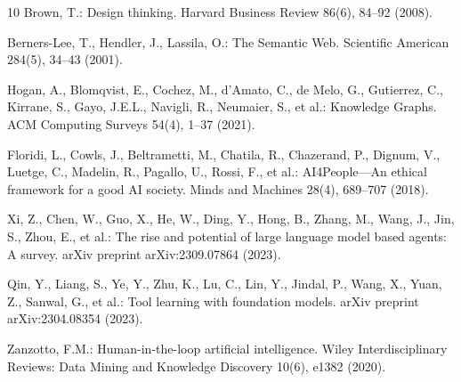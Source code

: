 \documentclass[sigconf]{acmart}
\begin{document}
\begin{thebibliography}{10}
Brown, T.: Design thinking. Harvard Business Review 86(6), 84--92 (2008).

Berners-Lee, T., Hendler, J., Lassila, O.: The Semantic Web. Scientific American 284(5), 34--43 (2001).

Hogan, A., Blomqvist, E., Cochez, M., d'Amato, C., de Melo, G., Gutierrez, C., Kirrane, S., Gayo, J.E.L., Navigli, R., Neumaier, S., et al.: Knowledge Graphs. ACM Computing Surveys 54(4), 1--37 (2021).

Floridi, L., Cowls, J., Beltrametti, M., Chatila, R., Chazerand, P., Dignum, V., Luetge, C., Madelin, R., Pagallo, U., Rossi, F., et al.: AI4People---An ethical framework for a good AI society. Minds and Machines 28(4), 689--707 (2018).

Xi, Z., Chen, W., Guo, X., He, W., Ding, Y., Hong, B., Zhang, M., Wang, J., Jin, S., Zhou, E., et al.: The rise and potential of large language model based agents: A survey. arXiv preprint arXiv:2309.07864 (2023).

Qin, Y., Liang, S., Ye, Y., Zhu, K., Lu, C., Lin, Y., Jindal, P., Wang, X., Yuan, Z., Sanwal, G., et al.: Tool learning with foundation models. arXiv preprint arXiv:2304.08354 (2023).

Zanzotto, F.M.: Human-in-the-loop artificial intelligence. Wiley Interdisciplinary Reviews: Data Mining and Knowledge Discovery 10(6), e1382 (2020).
\end{thebibliography}
\end{document}
